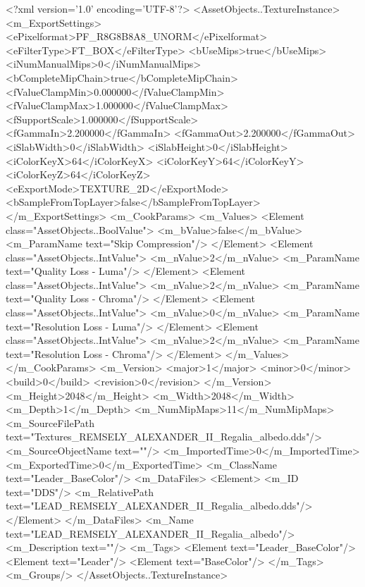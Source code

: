 <?xml version='1.0' encoding='UTF-8'?>
<AssetObjects..TextureInstance>
  <m_ExportSettings>
    <ePixelformat>PF_R8G8B8A8_UNORM</ePixelformat>
    <eFilterType>FT_BOX</eFilterType>
    <bUseMips>true</bUseMips>
    <iNumManualMips>0</iNumManualMips>
    <bCompleteMipChain>true</bCompleteMipChain>
    <fValueClampMin>0.000000</fValueClampMin>
    <fValueClampMax>1.000000</fValueClampMax>
    <fSupportScale>1.000000</fSupportScale>
    <fGammaIn>2.200000</fGammaIn>
    <fGammaOut>2.200000</fGammaOut>
    <iSlabWidth>0</iSlabWidth>
    <iSlabHeight>0</iSlabHeight>
    <iColorKeyX>64</iColorKeyX>
    <iColorKeyY>64</iColorKeyY>
    <iColorKeyZ>64</iColorKeyZ>
    <eExportMode>TEXTURE_2D</eExportMode>
    <bSampleFromTopLayer>false</bSampleFromTopLayer>
  </m_ExportSettings>
  <m_CookParams>
    <m_Values>
      <Element class="AssetObjects..BoolValue">
        <m_bValue>false</m_bValue>
        <m_ParamName text="Skip Compression"/>
      </Element>
      <Element class="AssetObjects..IntValue">
        <m_nValue>2</m_nValue>
        <m_ParamName text="Quality Loss - Luma"/>
      </Element>
      <Element class="AssetObjects..IntValue">
        <m_nValue>2</m_nValue>
        <m_ParamName text="Quality Loss - Chroma"/>
      </Element>
      <Element class="AssetObjects..IntValue">
        <m_nValue>0</m_nValue>
        <m_ParamName text="Resolution Loss - Luma"/>
      </Element>
      <Element class="AssetObjects..IntValue">
        <m_nValue>2</m_nValue>
        <m_ParamName text="Resolution Loss - Chroma"/>
      </Element>
    </m_Values>
  </m_CookParams>
  <m_Version>
    <major>1</major>
    <minor>0</minor>
    <build>0</build>
    <revision>0</revision>
  </m_Version>
  <m_Height>2048</m_Height>
  <m_Width>2048</m_Width>
  <m_Depth>1</m_Depth>
  <m_NumMipMaps>11</m_NumMipMaps>
  <m_SourceFilePath text="Textures\LEAD_REMSELY_ALEXANDER_II_Regalia_albedo.dds"/>
  <m_SourceObjectName text=""/>
  <m_ImportedTime>0</m_ImportedTime>
  <m_ExportedTime>0</m_ExportedTime>
  <m_ClassName text="Leader_BaseColor"/>
  <m_DataFiles>
    <Element>
      <m_ID text="DDS"/>
      <m_RelativePath text="LEAD_REMSELY_ALEXANDER_II_Regalia_albedo.dds"/>
    </Element>
  </m_DataFiles>
  <m_Name text="LEAD_REMSELY_ALEXANDER_II_Regalia_albedo"/>
  <m_Description text=""/>
  <m_Tags>
    <Element text="Leader_BaseColor"/>
    <Element text="Leader"/>
    <Element text="BaseColor"/>
  </m_Tags>
  <m_Groups/>
</AssetObjects..TextureInstance>
